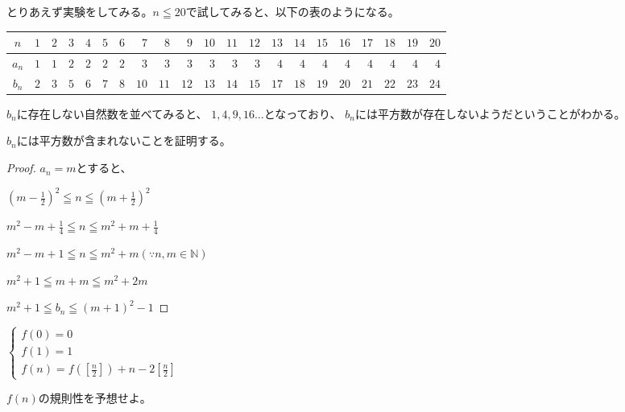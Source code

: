 \documentclass[uplatex,dvipdfmx]{jsbook}
\begin{document}
\begin{answer}
    とりあえず実験をしてみる。$n\leqq 20$で試してみると、以下の表のようになる。

    \begin{table}[h]
        \begin{center}
            \begin{tabular}{|c||r|r|r|r|r|r|r|r|r|r|r|r|r|r|r|r|r|r|r|r|}
                \hline
                $n$ & $1$ & $2$ & $3$ & $4$ & $5$ & $6$ & $7$ & $8$ & $9$ & $10$ & $11$ & $12$ & $13$ & $14$ & $15$ & $16$ & $17$ & $18$ & $19$ & $20$\\\hline
                $a_n$ & $1$ & $1$ & $2$ & $2$ & $2$ & $2$ & $3$ & $3$ & $3$ & $3$ & $3$ & $3$ & $4$ & $4$ & $4$ & $4$ & $4$ & $4$ & $4$ & $4$\\\hline
                $b_n$ & $2$ & $3$ & $5$ & $6$ & $7$ & $8$ & $10$ & $11$ & $12$ & $13$ & $14$ & $15$ & $17$ & $18$ & $19$ & $20$ & $21$ & $22$ & $23$ & $24$\\\hline
            \end{tabular}
        \end{center}
    \end{table}

    $b_n$に存在しない自然数を並べてみると、
    $1,4,9,16\dots$となっており、
    $b_n$には平方数が存在しないようだということがわかる。

    $b_n$には平方数が含まれないことを証明する。

    \begin{proof}
        $a_n=m$とすると、

        $\displaystyle \left(m-\frac{1}{2}\right) ^2\leqq n\leqq \left(m+\frac{1}{2}\right) ^2$

        $\displaystyle m^2-m+\frac{1}{4}\leqq n \leqq m^2+m+\frac{1}{4}$

        $\displaystyle m^2-m+1\leqq n \leqq m^2+m \left(\because n,m \in \mathbb{N}\right)$

        $m^2+1\leqq m+m \leqq m^2+2m$

        $m^2+1\leqq b_n \leqq \left(m+1\right)^2-1$

    \end{proof}

\end{answer}

\begin{problem}[練習問題2]
    \begin{math}
        \begin{cases}
            f\left(0\right)=0\\
            f\left(1\right)=1\\
            \displaystyle f\left(n\right)=f\left(\left[\frac{n}{2}\right]\right)+n-2\left[\frac{n}{2}\right]
        \end{cases}
    \end{math}

    $f\left(n\right)$の規則性を予想せよ。
\end{problem}
\end{document}
